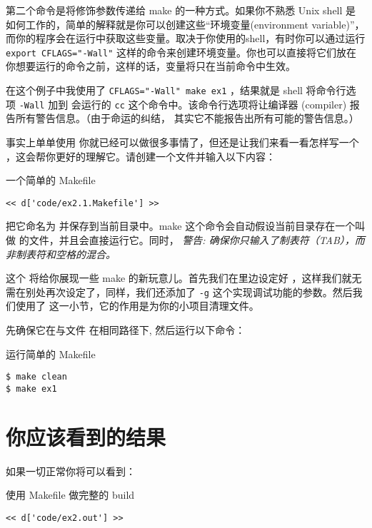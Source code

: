 第二个命令是将修饰参数传递给 make 的一种方式。如果你不熟悉 Unix shell 是如何工作的，简单的解释就是你可以创建这些“环境变量(environment variable)”，而你的程序会在运行中获取这些变量。取决于你使用的shell，有时你可以通过运行 \verb|export CFLAGS="-Wall"| 这样的命令来创建环境变量。你也可以直接将它们放在你想要运行的命令之前，这样的话，变量将只在当前命令中生效。

在这个例子中我使用了 \verb|CFLAGS="-Wall" make ex1| ，结果就是 shell 将命令行选项 \verb|-Wall| 加到  会运行的 \verb|cc| 这个命令中。该命令行选项将让编译器 (compiler)  报告所有警告信息。（由于命运的纠结， 其实它不能报告出所有可能的警告信息。）

事实上单单使用  你就已经可以做很多事情了，但还是让我们来看一看怎样写一个  ，这会帮你更好的理解它。请创建一个文件并输入以下内容：

\begin{code}{一个简单的 Makefile}
\begin{lstlisting}
<< d['code/ex2.1.Makefile'] >>
\end{lstlisting}
\end{code}

把它命名为  并保存到当前目录中。make 这个命令会自动假设当前目录存在一个叫做  的文件，并且会直接运行它。同时， \emph{警告: 确保你只输入了制表符（TAB），而非制表符和空格的混合。}

这个  将给你展现一些 make 的新玩意儿。首先我们在里边设定好 ，这样我们就无需在别处再次设定了，同样，我们还添加了 \verb|-g| 这个实现调试功能的参数。然后我们使用了  这一小节，它的作用是为你的小项目清理文件。

先确保它在与文件  在相同路径下, 然后运行以下命令：

\begin{Terminal}{运行简单的 Makefile}
\begin{lstlisting}
$ make clean
$ make ex1
\end{lstlisting}
\end{Terminal}


\section{你应该看到的结果}

如果一切正常你将可以看到：

\begin{Terminal}{使用 Makefile 做完整的 build}
\begin{lstlisting}
<< d['code/ex2.out'] >>
\end{lstlisting}
\end{Terminal}

